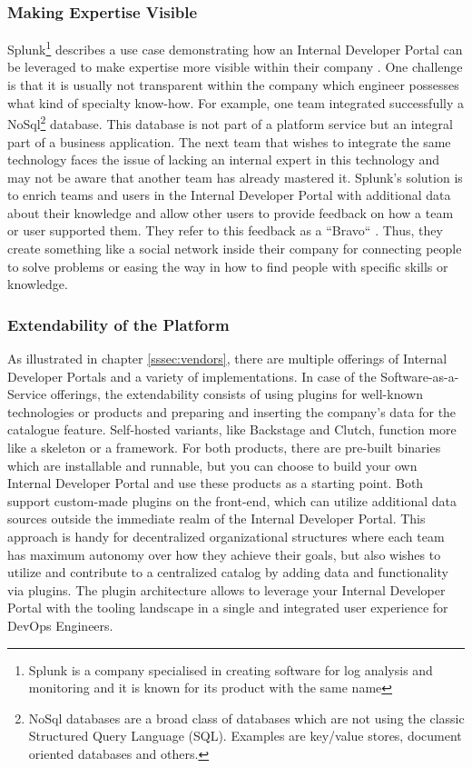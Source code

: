 \documentclass[a4paper,10pt]{article}
\begin{document}
    \subsubsection{Making Expertise Visible}
    \label{sssec:expertise}
    Splunk\footnote{Splunk is a company specialised in creating software for log analysis and monitoring and it is known
    for its product with the same name}
    describes a use case demonstrating how an Internal Developer Portal can be leveraged to make expertise more visible
    within their company\parencite{splunkidp} .
    One challenge is that it is usually not transparent within the company which engineer possesses what kind of specialty
    know-how.
    For example, one team integrated successfully a NoSql\footnote{NoSql databases are a broad class of databases which
    are not using the classic Structured Query Language (SQL). Examples are key/value stores, document oriented
    databases and others.  } database.
    This database is not part of a platform service but an integral part of a business application.
    The next team that wishes to integrate the same technology faces the issue of lacking an internal expert in this
    technology and may not be aware that another team has already mastered it.
    Splunk's solution is to enrich teams and users in the Internal Developer Portal with additional data about their
    knowledge and allow other users to provide feedback on how a team or user supported them.
    They refer to this feedback as a ``Bravo`` .
    Thus, they create something like a social network inside their company for connecting people to solve problems or
    easing the way in how to find people with specific skills or knowledge.

    \subsubsection{Extendability of the Platform}
    \label{sssec:extendability}
    As illustrated in chapter \ref{sssec:vendors}, there are multiple offerings of Internal Developer Portals and a
    variety of implementations.
    In case of the Software-as-a-Service offerings, the extendability consists of using plugins for well-known
    technologies or products and preparing and inserting the company's data for the catalogue feature.
    Self-hosted variants, like Backstage and Clutch, function more like a skeleton or a framework.
    For both products, there are pre-built binaries which are installable and runnable, but you can choose to build your
    own Internal Developer Portal and use these products as a starting point.
    Both support custom-made plugins on the front-end, which can utilize additional data sources outside the immediate
    realm of the Internal Developer Portal.
    This approach is handy for decentralized organizational structures where each team has maximum autonomy over how
    they achieve their goals, but also wishes to utilize and contribute to a centralized catalog by adding data and
    functionality via plugins.
    The plugin architecture allows to leverage your Internal Developer Portal with the tooling landscape in a
    single and integrated user experience for DevOps Engineers.
\end{document}
